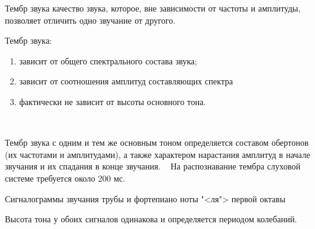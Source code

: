 \documentclass{beamer}
\begin{document}
\begin{frame}
  \begin{block}{Тембр звука}
качество звука, которое, вне зависимости от частоты и амплитуды, позволяет отличить одно звучание от другого. 
  \end{block}

  Тембр звука:
  \begin{enumerate}
    \item зависит от общего спектрального состава звука;
    \item зависит от соотношения амплитуд составляющих спектра
    \item фактически не зависит от высоты основного тона.
  \end{enumerate}  

  ~

  Тембр звука с одним и тем же основным тоном определяется составом обертонов (их частотами и амплитудами), а также характером нарастания амплитуд в начале звучания и их спадания в конце звучания. 
  ~  
  На распознавание тембра слуховой системе требуется около 200 мс. 
\end{frame}

\begin{frame}
  \begin{block}{Сигналограммы звучания трубы и фортепиано ноты "<ля"> первой октавы}
  \end{block}
  Высота тона у обоих сигналов одинакова и определяется периодом колебаний. 
\end{frame}
\end{document}
